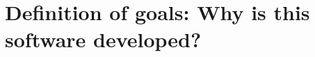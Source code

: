 \section[Definition of goals: Why is this software developed?]{Definition of goals: Why is this software developed?}

